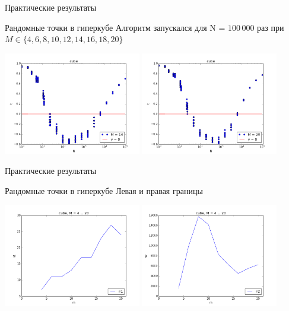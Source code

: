 \documentclass{beamer}
\begin{document}
\begin{frame}{Практические результаты}
\begin{block}{Рандомные точки в гиперкубе}
Алгоритм запускался для N = $100\,000$ раз при $M \in \{4, 6, 8, 10, 12, 14, 16, 18, 20\}$
\begin{table}[h]
\begin{center}
\includegraphics[width=6cm]{pic/cube_m=14}
\includegraphics[width=6cm]{pic/cube_m=20}
\end{center}
\end{table}
\end{block}
\end{frame}

\begin{frame}{Практические результаты}
\begin{block}{Рандомные точки в гиперкубе}
Левая и правая границы 
\begin{table}[h]
\begin{center}
\includegraphics[width=6cm]{pic/cube_n1-}
\includegraphics[width=6cm]{pic/cube_n2-}
\end{center}
\end{table}
\end{block}
\end{frame}
\end{document}
